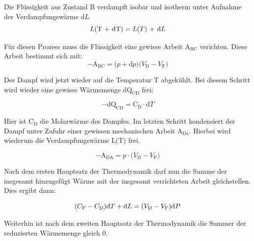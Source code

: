 \noindent Die Flüssigkeit aus Zustand B verdampft isobar und isotherm unter Aufnahme der Verdampfungswärme d$L$\\

\begin{equation}
L\text{(T + dT)} = L\text{(}T\text{) + d}L\nonumber\\
\end{equation}

\noindent Für diesen Prozess muss die Flüssigkeit eine gewisse Arbeit $\text{A}_\text{BC}$ verichten. Diese Arbeit bestimmt sich mit:\\

\begin{equation}
   - \text{A}_\text{BC} = \text{(}p + \text{d}p\text{)(}V_\text{D} - V_\text{F}\text{)} \nonumber
\end{equation}

\noindent Der Dampf wird jetzt wieder auf die Temperatur T abgekühlt.
Bei diesem Schritt wird wieder eine gewisse Wärmemenge $\text{dQ}_\text{CD}$ frei:

\begin{equation}
 -\text{dQ}_\text{CD} =\text{C}_\text{D}\cdot \text{d}T  \nonumber
\end{equation}

\noindent Hier ist $\text{C}_\text{D}$ die Molarwärme des Dampfes.
Im letzten Schritt kondensiert der Dampf unter Zufuhr einer gewissen mechanischen Arbeit $\text{A}_\text{Da}$.
Hierbei wird wiederum die Verdampfungswärme L(T) frei.

\begin{equation}
    -\text{A}_\text{DA}= p\cdot\text{(}V_\text{D} - V_\text{F}\text{)}  \nonumber
\end{equation}



\noindent Nach dem ersten Hauptsatz der Thermodynamik darf nun die Summe der insgesamt hinzugefügt Wärme mit der insgesamt 
verrichteten Arbeit gleichstellen. Dies ergibt dann:    

\begin{equation}
    (C_\text{F}-C_\text{D}\text{)d}T + \text{d}L = \text{(}V_\text{D}-V_\text{F}\text{)d}P\\
    \label{eqn:wearme=Arbeit}
\end{equation}

\noindent Weiterhin ist nach dem zweiten Hauptsatz der Thermodynamik die Summer der reduzierten Wärmemenge gleich 0.

